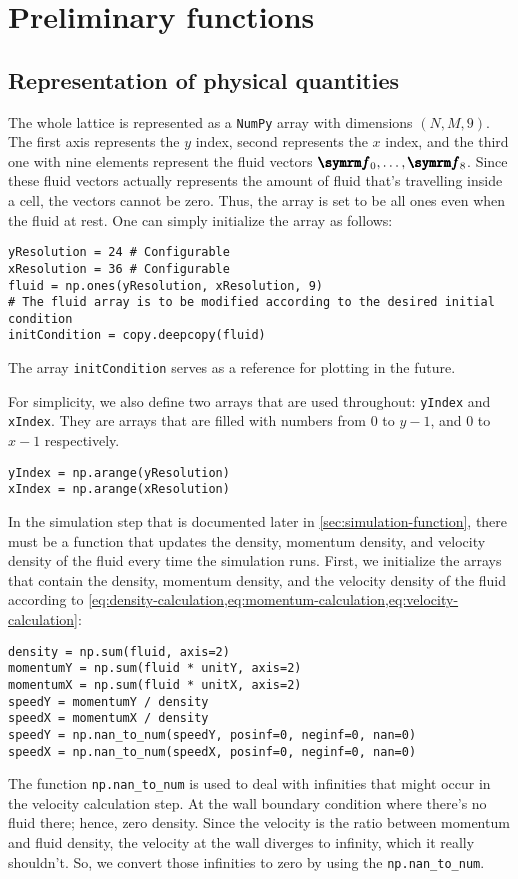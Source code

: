 \section{Preliminary functions}

\subsection{Representation of physical quantities}

The whole lattice is represented as a \texttt{NumPy} array with dimensions $(N, M, 9)$. The first axis represents the $y$ index, second represents the $x$ index, and the third one with nine elements represent the fluid vectors $\vv{f}_0, \dots, \vv{f}_8$. Since these fluid vectors actually represents the amount of fluid that's travelling inside a cell, the vectors cannot be zero. Thus, the array is set to be all ones even when the fluid at rest. One can simply initialize the array as follows:
\begin{verbatim}
yResolution = 24 # Configurable
xResolution = 36 # Configurable
fluid = np.ones(yResolution, xResolution, 9)
# The fluid array is to be modified according to the desired initial condition
initCondition = copy.deepcopy(fluid)
\end{verbatim}
The array \texttt{initCondition} serves as a reference for plotting in the future.

For simplicity, we also define two arrays that are used throughout: \texttt{yIndex} and \texttt{xIndex}. They are arrays that are filled with numbers from $0$ to $y - 1$, and $0$ to $x - 1$ respectively.
\begin{verbatim}
yIndex = np.arange(yResolution)
xIndex = np.arange(xResolution)
\end{verbatim}

In the simulation step that is documented later in \cref{sec:simulation-function}, there must be a function that updates the density, momentum density, and velocity density of the fluid every time the simulation runs. First, we initialize the arrays that contain the density, momentum density, and the velocity density of the fluid according to \cref{eq:density-calculation,eq:momentum-calculation,eq:velocity-calculation}:
\begin{verbatim}
density = np.sum(fluid, axis=2)
momentumY = np.sum(fluid * unitY, axis=2)
momentumX = np.sum(fluid * unitX, axis=2)
speedY = momentumY / density
speedX = momentumX / density
speedY = np.nan_to_num(speedY, posinf=0, neginf=0, nan=0)
speedX = np.nan_to_num(speedX, posinf=0, neginf=0, nan=0)
\end{verbatim}
The function \texttt{np.nan\_to\_num} is used to deal with infinities that might occur in the velocity calculation step. At the wall boundary condition where there's no fluid there; hence, zero density. Since the velocity is the ratio between momentum and fluid density, the velocity at the wall diverges to infinity, which it really shouldn't. So, we convert those infinities to zero by using the \texttt{np.nan\_to\_num}.

